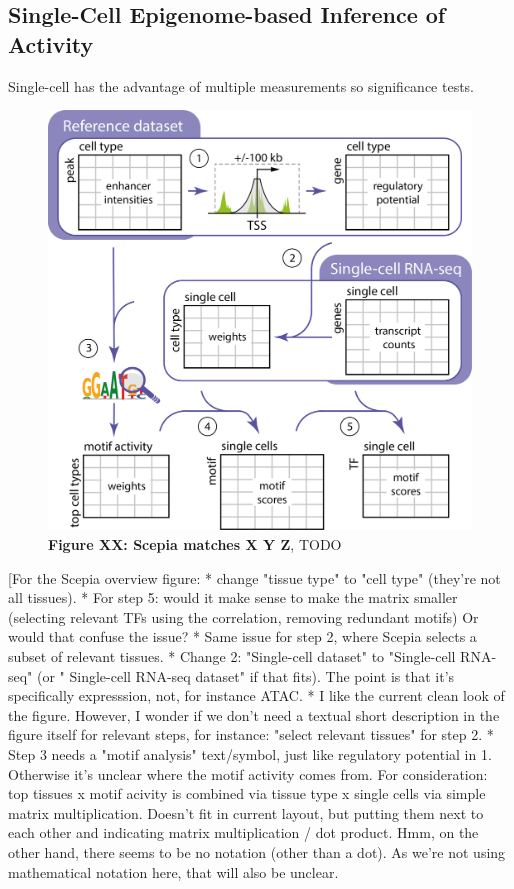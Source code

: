 \subsection{Single-Cell Epigenome-based Inference of Activity}

Single-cell has the advantage of multiple measurements so significance tests.

\begin{figure}
    \centering
    \includegraphics[width=1\linewidth]{20231106_OverviewFigure_SvH_v2.png}
    \caption{\textbf{Figure XX: Scepia matches X Y Z}, TODO}
    \label{fig:scepia_overview}
\end{figure}
[For the Scepia overview figure: 
* change "tissue type"  to "cell type" (they're not all tissues). 
* For step 5: would it make sense to make the matrix smaller (selecting relevant TFs using the correlation, removing redundant motifs) Or would that confuse the issue?
* Same issue for step 2, where Scepia selects a subset of relevant tissues.
* Change 2: "Single-cell dataset" to "Single-cell RNA-seq" (or " Single-cell RNA-seq dataset" if that fits). The point is that it's specifically expresssion, not, for instance ATAC.   
* I like the current clean look of the figure. However, I wonder if we don't need a textual short description in the figure itself for relevant steps, for instance: "select relevant tissues"  for step 2. 
* Step 3 needs a "motif analysis" text/symbol, just like regulatory potential in 1. Otherwise it's unclear where the motif activity comes from.
For consideration: top tissues x motif acivity is combined via tissue type x single cells via simple matrix multiplication. Doesn't fit in current layout, but putting them next to each other and indicating matrix multiplication / dot product. Hmm, on the other hand, there seems to be no notation (other than a dot). As we're not using mathematical notation here, that will also be unclear.

